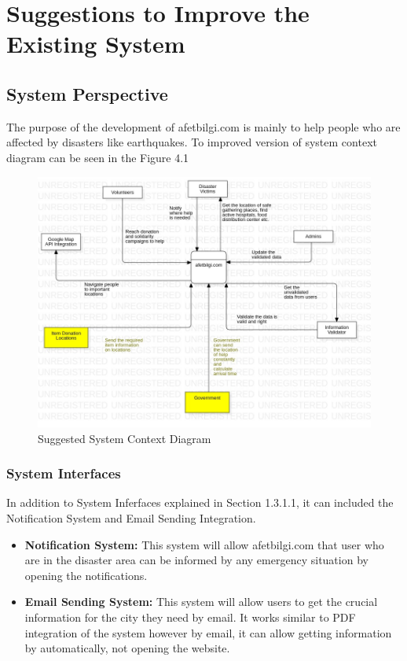 \chapter{Suggestions to Improve the Existing System}

\section{System Perspective}
The purpose of the development of afetbilgi.com is mainly to help people who are affected
by disasters like earthquakes. To improved version of system context diagram can be seen in the Figure 4.1
\begin{figure}[H]
    \begin{center}
        \includegraphics[scale = 0.50]{assets/System Context DiagramSuggestion.jpg}
        \caption[Suggested System Context Diagram]{Suggested System Context Diagram}
    \end{center}
\end{figure}
\subsection*{System Interfaces}
In addition to System Inferfaces explained in Section 1.3.1.1, it can included the Notification System and Email Sending Integration.

\begin{itemize}
    \item \textbf{Notification System: } This system will allow afetbilgi.com that user who are in the disaster area can be informed by any emergency situation by opening the notifications.
    \item \textbf{Email Sending System: } This system will allow users to get the crucial information for the city they need by email. It works similar to PDF integration of the system however by email, it can allow getting information by automatically, not opening the website. 
\end{itemize}

